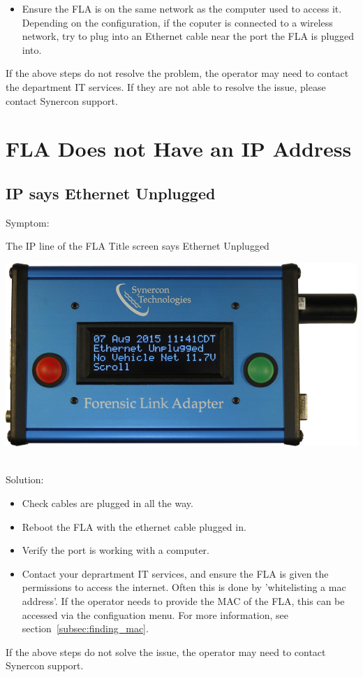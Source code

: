 \documentclass[11pt, oneside]{book}
\begin{document}
\begin{itemize}
\item Ensure the FLA is on the same network as the computer used to access it. Depending on the configuration, if the coputer is connected to a wireless network, try to plug into an Ethernet cable near the port the FLA is plugged into.
\end{itemize}
If the above steps do not resolve the problem, the operator may need to contact the department IT services. If they are not able to resolve the issue, please contact Synercon support.

\section{FLA Does not Have an IP Address}
\subsection{IP says Ethernet Unplugged}
Symptom:\\
\noindent\begin{minipage}{0.45\textwidth}%
The IP line of the FLA Title screen says Ethernet Unplugged
\end{minipage}%
\hfill%
\begin{minipage}{0.45\textwidth}
\includegraphics[width=\linewidth]{../media/fla_screens/no_ethernet/title_no_net}
\end{minipage}\\
Solution:\\
\begin{itemize}
\item Check cables are plugged in all the way.
\item Reboot the FLA with the ethernet cable plugged in.
\item Verify the port is working with a computer.
\item Contact your deprartment IT services, and ensure the FLA is given the permissions to access the internet. Often this is done by 'whitelisting a mac address'. If the operator needs to provide the MAC of the FLA, this can be accessed via the configuation menu. For more information, see section~\ref{subsec:finding_mac}.
\end{itemize}
If the above steps do not solve the issue, the operator may need to contact Synercon support.
\end{document}
